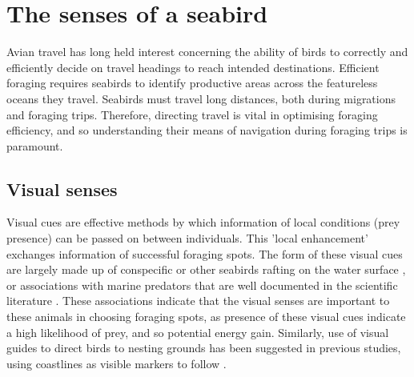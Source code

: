 \documentclass[9pt,twocolumn,twoside,lineno]{pnas-new}
\begin{document}
\section{The senses of a seabird}
Avian travel has long held interest concerning the ability of birds to correctly and efficiently decide on travel headings to reach intended destinations. Efficient foraging requires seabirds to identify productive areas across the featureless oceans they travel. Seabirds must travel long distances, both during migrations and foraging trips. Therefore, directing travel is vital in optimising foraging efficiency, and so understanding their means of navigation during foraging trips is paramount.

\subsection{Visual senses}
Visual cues are effective methods by which information of local conditions (prey presence) can be passed on between individuals. This 'local enhancement' exchanges information of successful foraging spots. The form of these visual cues are largely made up of conspecific or other seabirds rafting on the water surface \citep{Weimerskirch_2010b}, or associations with marine predators that are well documented in the scientific literature \citep{Nevitt_1999, Sakamoto_2009a, Silverman_2004, Thiebot_2012}. These associations indicate that the visual senses are important to these animals in choosing foraging spots, as presence of these visual cues indicate a high likelihood of prey, and so potential energy gain. Similarly, use of visual guides to direct birds to nesting grounds has been suggested in previous studies, using coastlines as visible markers to follow \citep{Pollonara_2015,Yamamoto_2008}.

\end{document}
